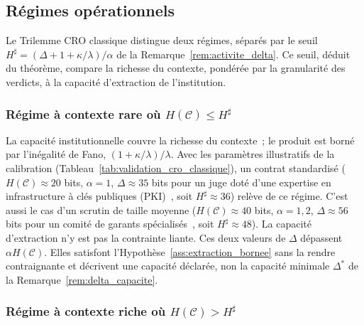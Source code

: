 \subsection{R\'egimes op\'erationnels}
\label{subsec:regimes_operationnels}
\begin{sloppypar}
Le Trilemme CRO classique distingue deux r\'egimes, s\'epar\'es par le seuil
$H^\sharp = (\Delta + 1 + \kappa/\lambda)/\alpha$ de la
Remarque~\ref{rem:activite_delta}. Ce seuil, d\'eduit du th\'eor\`eme,
compare la richesse du contexte, pond\'er\'ee par la granularit\'e des
verdicts, \`a la capacit\'e d'extraction de l'institution.

\subsubsection{R\'egime \`a contexte rare o\`u $H(\mathcal{C}) \leq H^\sharp$}
\label{subsubsec:regime_faible_contexte}

La capacit\'e institutionnelle couvre la richesse du contexte~; le produit est
born\'e par l'in\'egalit\'e de Fano, $(1+\kappa/\lambda)/\lambda$. Avec les
param\`etres illustratifs de la calibration (Tableau~\ref{tab:validation_cro_classique}),
un contrat standardis\'e ($H(\mathcal{C}) \approx 20$ bits, $\alpha = 1$,
$\Delta \approx 35$ bits pour un juge dot\'e d'une expertise en infrastructure \`a cl\'es publiques (PKI)~\cite{Mason07,Kerr04}, soit
$H^\sharp \approx 36$) rel\`eve de ce r\'egime. C'est aussi le cas d'un scrutin de taille moyenne ($H(\mathcal{C}) \approx 40$
bits, $\alpha = 1{,}2$, $\Delta \approx 56$ bits pour un comit\'e de garants
sp\'ecialis\'es~\cite{Goodman15}, soit $H^\sharp \approx 48$). La capacit\'e d'extraction n'y est pas la contrainte liante. Ces deux valeurs de
$\Delta$ d\'epassent $\alpha H(\mathcal{C})$. Elles satisfont l'Hypoth\`ese~\ref{ass:extraction_bornee}
sans la rendre contraignante et d\'ecrivent une capacit\'e d\'eclar\'ee, non la capacit\'e minimale
$\Delta^*$ de la Remarque~\ref{rem:delta_capacite}.

\subsubsection{R\'egime \`a contexte riche o\`u $H(\mathcal{C}) > H^\sharp$}
\label{subsubsec:regime_haute_contexte}
\label{subsubsec:regime_transition}


\end{sloppypar}
